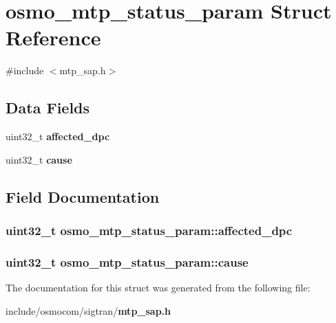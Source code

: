 \section{osmo\+\_\+mtp\+\_\+status\+\_\+param Struct Reference}
\label{structosmo__mtp__status__param}


{\ttfamily \#include $<$mtp\+\_\+sap.\+h$>$}

\subsection*{Data Fields}
\begin{DoxyCompactItemize}
\item 
uint32\+\_\+t {\bf affected\+\_\+dpc}
\item 
uint32\+\_\+t {\bf cause}
\end{DoxyCompactItemize}


\subsection{Field Documentation}
\subsubsection[{affected\+\_\+dpc}]{\setlength{\rightskip}{0pt plus 5cm}uint32\+\_\+t osmo\+\_\+mtp\+\_\+status\+\_\+param\+::affected\+\_\+dpc}\label{structosmo__mtp__status__param_a6151089dfb6e797c80c34c47e611d5e7}
\subsubsection[{cause}]{\setlength{\rightskip}{0pt plus 5cm}uint32\+\_\+t osmo\+\_\+mtp\+\_\+status\+\_\+param\+::cause}\label{structosmo__mtp__status__param_a13483ca74feb301920e246f02b563cec}


The documentation for this struct was generated from the following file\+:\begin{DoxyCompactItemize}
\item 
include/osmocom/sigtran/{\bf mtp\+\_\+sap.\+h}\end{DoxyCompactItemize}

